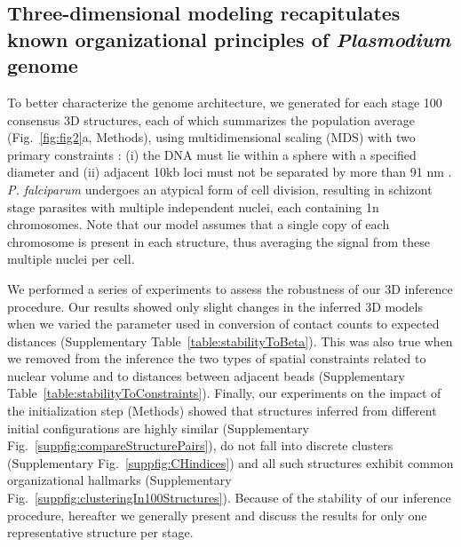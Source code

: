 \subsection*{Three-dimensional modeling recapitulates known organizational principles of {\em Plasmodium} genome}

To better characterize the genome architecture, we generated for each stage 100 consensus 3D structures, each of which summarizes the population average (Fig.~\ref{fig:fig2}a, Methods), using multidimensional scaling (MDS) with two primary constraints \citep{duan:three-dimensional}: (i) the DNA must lie within a sphere with a specified diameter \citep{bannister:making, weiner:3d} and (ii) adjacent 10kb loci must not be separated by more than 91 nm \citep{bystricky:long-range}. \emph{P. falciparum} undergoes an atypical form of cell division, resulting in schizont stage parasites with multiple independent nuclei, each containing 1n chromosomes. Note that our model assumes that a single copy of each chromosome is present in each structure, thus averaging the signal from these multiple nuclei per cell.


We performed a series of experiments to assess the robustness of our 3D inference procedure.  Our results showed only slight changes in the inferred 3D models when we varied the parameter used in conversion of contact counts to expected distances (Supplementary Table~\ref*{table:stabilityToBeta}). This was also true when we removed from the inference the two types of spatial constraints related to nuclear volume and to distances between adjacent beads (Supplementary Table~\ref*{table:stabilityToConstraints}). Finally, our experiments on the impact of the initialization step (Methods) showed that structures inferred from different initial configurations are highly similar (Supplementary Fig.~\ref*{suppfig:compareStructurePairs}), do not fall into discrete clusters (Supplementary Fig.~\ref*{suppfig:CHindices}) and all such structures exhibit common organizational hallmarks (Supplementary Fig.~\ref*{suppfig:clusteringIn100Structures}). Because of the stability of our inference procedure, hereafter we generally present and discuss the results for only one representative structure per stage.


